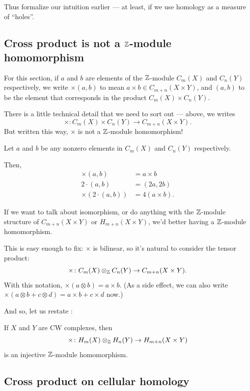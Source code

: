 Thus formalize our intuition earlier --- at least, if we use homology as a measure of ``holes''.

\subsection{Cross product is not a $\mathbb Z$-module homomorphism}

For this section, if $a$ and $b$ are elements of the $\mathbb Z$-module $C_m(X)$ and $C_n(Y)$ respectively,
we write $\times(a, b)$ to mean $a \times b \in C_{m + n}(X \times Y)$, and $(a, b)$
to be the element that corresponds in the product $C_m(X) \times C_n(Y)$.

There is a little technical detail that we need to sort out --- above, we writes
\[ \times \colon C_m(X) \times C_n(Y) \to C_{m + n}(X \times Y). \]
But written this way, $\times$ is not a $\mathbb Z$-module homomorphism!

\begin{example}
	Let $a$ and $b$ be any nonzero elements in $C_m(X)$ and $C_n(Y)$ respectively.

	Then,
	\begin{align*}
		\times(a, b) &= a \times b \\
		2 \cdot (a, b) &= (2a, 2b) \\
		\times(2 \cdot (a, b)) &= 4(a \times b).
	\end{align*}
\end{example}

If we want to talk about isomorphism, or do anything with the $\mathbb Z$-module structure of $C_{m + n}(X
\times Y)$ or $H_{m + n}(X \times Y)$, we'd better having a $\mathbb Z$-module homomorphism.

This is easy enough to fix: $\times$ is bilinear, so it's natural to consider the tensor product:
\[ \times \colon C_m(X) \otimes_\mathbb Z C_n(Y) \to C_{m + n}(X \times Y). \]
With this notation, $\times(a \otimes b) = a \times b$.
(As a side effect, we can also write
$\times(a \otimes b + c \otimes d) = a \times b + c \times d$ now.)

And so, let us restate :
\begin{theorem}
	If $X$ and $Y$ are CW complexes, then
	\[ \times \colon H_m(X) \otimes_\mathbb Z H_n(Y) \to H_{m + n}(X \times Y) \]
	is an injective $\mathbb Z$-module homomorphism.
\end{theorem}

\subsection{Cross product on cellular homology}

